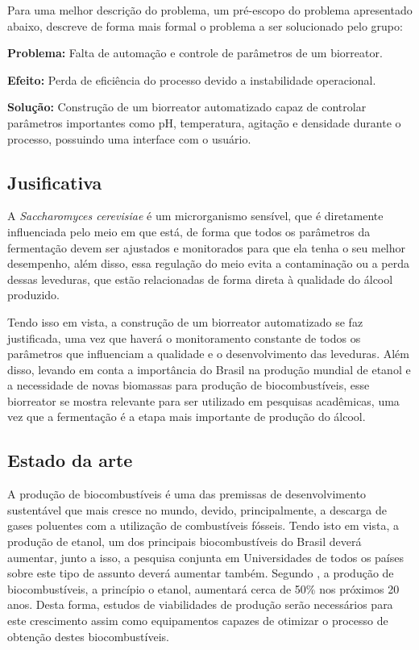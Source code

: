 Para uma melhor descrição do problema, um pré-escopo do problema apresentado abaixo, descreve de forma mais formal o problema a ser solucionado pelo grupo:

\textbf{Problema:} Falta de automação e controle de parâmetros de um biorreator.

\textbf{Efeito:} Perda de eficiência do processo devido a instabilidade operacional.

\textbf{Solução:} Construção de um biorreator automatizado capaz de controlar parâmetros importantes como pH, temperatura, agitação e densidade durante o processo, possuindo uma interface com o usuário.

\subsection{Jusificativa}

A \textit{Saccharomyces cerevisiae} é um microrganismo sensível, que é diretamente influenciada pelo meio em que está, de forma que todos os parâmetros da fermentação devem ser ajustados e monitorados para que ela tenha o seu melhor desempenho, além disso, essa regulação do meio evita a contaminação ou a perda dessas leveduras, que estão relacionadas de forma direta à qualidade do álcool produzido.

Tendo isso em vista, a construção de um biorreator automatizado se faz justificada, uma vez que haverá o monitoramento constante de todos os parâmetros que influenciam a qualidade e o desenvolvimento das leveduras. Além disso, levando em conta a importância do Brasil na produção mundial de etanol e a necessidade de novas biomassas para produção de biocombustíveis, esse biorreator se mostra relevante para ser utilizado em pesquisas acadêmicas, uma vez que a fermentação é a etapa mais importante de produção do álcool.

\subsection{Estado da arte}

A produção de biocombustíveis é uma das premissas de desenvolvimento sustentável que mais cresce no mundo, devido, principalmente, a descarga de gases poluentes com a utilização de combustíveis fósseis. Tendo isto em vista, a produção de etanol, um dos principais biocombustíveis do Brasil deverá aumentar, junto a isso, a pesquisa conjunta em Universidades de todos os países sobre este tipo de assunto deverá aumentar também. Segundo \cite{leite2007biocombustivel}, a produção de biocombustíveis, a princípio o etanol, aumentará cerca de 50\% nos próximos 20 anos. Desta forma, estudos de viabilidades de produção serão necessários para este crescimento assim como equipamentos capazes de otimizar o processo de obtenção destes biocombustíveis.

